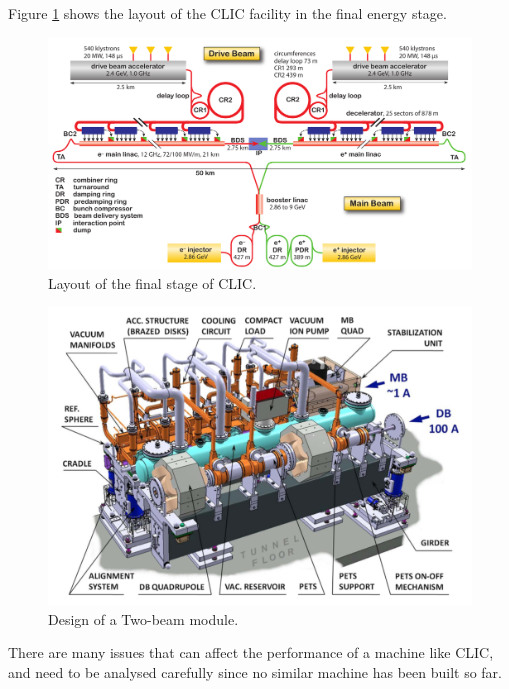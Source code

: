 Figure \ref{CLIC_layout} shows the layout of the CLIC facility in the final energy stage.

\begin{figure}[h]
\centering

\includegraphics[scale=0.39]{pictures/CLIC_layout_3Tev}
\caption{Layout of the final stage of CLIC.}
\label{CLIC_layout}

\end{figure}

\begin{figure}

\includegraphics[scale=0.39]{pictures/TBM}
\caption{Design of a Two-beam module. }
\label{TBM}

\end{figure}







There are many issues that can affect the performance of a machine like CLIC, and need to be analysed carefully since no similar machine has been built so far. 

